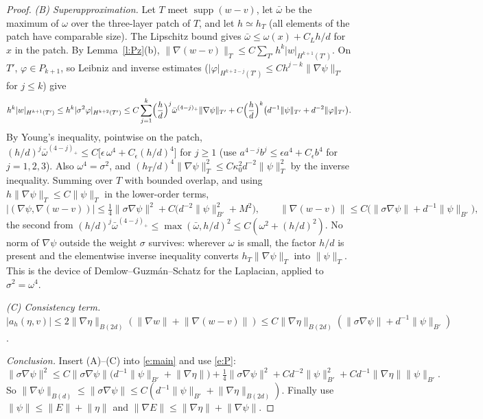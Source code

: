 \documentclass[11pt,reqno]{amsart}
\theoremstyle{plain}
\theoremstyle{definition}
\newcommand{\norm}[1]{\lVert #1\rVert}
\DeclareMathOperator{\supp}{supp}
\begin{document}
\begin{proof}
\emph{(B) Superapproximation.} Let $T$ meet $\supp(w-v)$, let $\bar\omega$ be the maximum of $\omega$ over the three-layer patch of $T$, and let $h\simeq h_T$ (all elements of the patch have comparable size). The Lipschitz bound gives $\bar\omega\le\omega(x)+C_Lh/d$ for $x$ in the patch. By Lemma~\ref{l:Pz}(b), $\norm{\nabla(w-v)}_T\le C\sum_{T'}h^k|w|_{H^{k+1}(T')}$. On $T'$, $\varphi\in P_{k+1}$, so Leibniz and inverse estimates ($|\varphi|_{H^{k+2-j}(T')}\le Ch^{j-k}\norm{\nabla\psi}_{T'}$ for $j\le k$) give
\[
h^k|w|_{H^{k+1}(T')}\le h^k|\sigma^2\varphi|_{H^{k+2}(T')}\le C\sum_{j=1}^{k}\Bigl(\frac hd\Bigr)^j\bar\omega^{(4-j)_+}\norm{\nabla\psi}_{T'}+C\Bigl(\frac hd\Bigr)^k\bigl(d^{-1}\norm\psi_{T'}+d^{-2}\norm\varphi_{T'}\bigr).
\]
By Young's inequality, pointwise on the patch, $(h/d)^j\bar\omega^{(4-j)_+}\le C\bigl[\epsilon\,\omega^4+C_\epsilon(h/d)^4\bigr]$ for $j\ge1$ (use $a^{4-j}b^j\le\epsilon a^4+C_\epsilon b^4$ for $j=1,2,3$). Also $\omega^4=\sigma^2$, and $(h_T/d)^4\norm{\nabla\psi}_T^2\le C\kappa_0^2d^{-2}\norm\psi_T^2$ by the inverse inequality. Summing over $T$ with bounded overlap, and using $h\norm{\nabla\psi}_T\le C\norm\psi_T$ in the lower-order terms,
\[
|(\nabla\psi,\nabla(w-v))|\le\tfrac14\norm{\sigma\nabla\psi}^2+C\bigl(d^{-2}\norm\psi_{B'}^2+M^2\bigr),\qquad \norm{\nabla(w-v)}\le C\bigl(\norm{\sigma\nabla\psi}+d^{-1}\norm\psi_{B'}\bigr),
\]
the second from $(h/d)^j\bar\omega^{(4-j)_+}\le\max(\bar\omega,h/d)^2\le C(\omega^2+(h/d)^2)$. No norm of $\nabla\psi$ outside the weight $\sigma$ survives: wherever $\omega$ is small, the factor $h/d$ is present and the elementwise inverse inequality converts $h_T\norm{\nabla\psi}_T$ into $\norm\psi_T$. This is the device of Demlow--Guzm\'an--Schatz for the Laplacian, applied to $\sigma^2=\omega^4$.

\emph{(C) Consistency term.} $|a_h(\eta,v)|\le2\norm{\nabla\eta}_{B(2d)}(\norm{\nabla w}+\norm{\nabla(w-v)})\le C\norm{\nabla\eta}_{B(2d)}(\norm{\sigma\nabla\psi}+d^{-1}\norm\psi_{B'})$.

\emph{Conclusion.} Insert (A)--(C) into \eqref{e:main} and use \eqref{e:P}:
\[
\norm{\sigma\nabla\psi}^2\le C\norm{\sigma\nabla\psi}\bigl(d^{-1}\norm\psi_{B'}+\norm{\nabla\eta}\bigr)+\tfrac14\norm{\sigma\nabla\psi}^2+Cd^{-2}\norm\psi^2_{B'}+Cd^{-1}\norm{\nabla\eta}\norm\psi_{B'} .
\]
So $\norm{\nabla\psi}_{B(d)}\le\norm{\sigma\nabla\psi}\le C(d^{-1}\norm\psi_{B'}+\norm{\nabla\eta}_{B(2d)})$. Finally use $\norm\psi\le\norm E+\norm\eta$ and $\norm{\nabla E}\le\norm{\nabla\eta}+\norm{\nabla\psi}$.
\end{proof}
\end{document}
